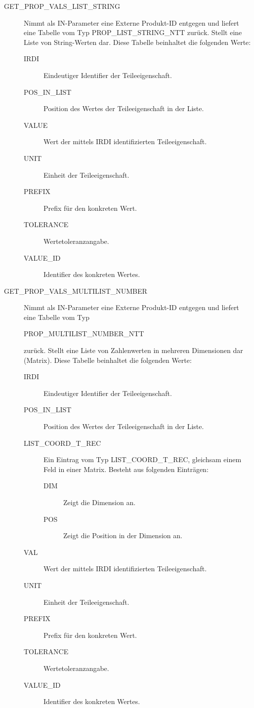 \begin{description}
\item[GET\_PROP\_VALS\_LIST\_STRING] Nimmt als IN-Parameter eine Externe Produkt-ID entgegen und liefert eine Tabelle vom Typ PROP\_LIST\_STRING\_NTT zurück. Stellt eine Liste von String-Werten dar. 
Diese Tabelle beinhaltet die folgenden Werte: 

  \begin{description}
  \item[IRDI] Eindeutiger Identifier der Teileeigenschaft.
  \item[POS\_IN\_LIST] Position des Wertes der Teileeigenschaft in der Liste.
  \item[VALUE] Wert der mittels IRDI identifizierten Teileeigenschaft.
  \item[UNIT] Einheit der Teileeigenschaft.
  \item[PREFIX] Prefix für den konkreten Wert.
  \item[TOLERANCE] Wertetoleranzangabe.
  \item[VALUE\_ID] Identifier des konkreten Wertes.
  \end{description}
\item[GET\_PROP\_VALS\_MULTILIST\_NUMBER] Nimmt als IN-Parameter eine Externe Produkt-ID entgegen und liefert eine Tabelle vom Typ 

PROP\_MULTILIST\_NUMBER\_NTT 

zurück. Stellt eine Liste von Zahlenwerten in mehreren Dimensionen dar (Matrix). 
Diese Tabelle beinhaltet die folgenden Werte: 

  \begin{description}
  \item[IRDI] Eindeutiger Identifier der Teileeigenschaft.
  \item[POS\_IN\_LIST] Position des Wertes der Teileeigenschaft in der Liste.
  \item[LIST\_COORD\_T\_REC] Ein Eintrag vom Typ LIST\_COORD\_T\_REC, gleichsam einem Feld in einer Matrix. Besteht aus folgenden Einträgen:
    \begin{description}	
    \item[DIM] Zeigt die Dimension an.
    \item[POS] Zeigt die Position in der Dimension an. 
    \end{description}
  \item[VAL] Wert der mittels IRDI identifizierten Teileeigenschaft.
  \item[UNIT] Einheit der Teileeigenschaft.
  \item[PREFIX] Prefix für den konkreten Wert.
  \item[TOLERANCE] Wertetoleranzangabe.
  \item[VALUE\_ID] Identifier des konkreten Wertes.
  \end{description}


\end{description}
